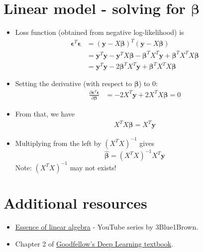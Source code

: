 \documentclass{article}
\theoremstyle{remark}
\theoremstyle{definition}
\begin{document}
\section*{Linear model - solving for $\bm{\beta}$}
\begin{itemize}
	\item Loss function (obtained from negative log-likelihood) is 
	\begin{align*}
		\bm{\epsilon}^T \bm{\epsilon}
		&= \left( \bm{y} - X\bm{\beta} \right)^T \left( \bm{y} - X\bm{\beta} \right) \\
		&= \bm{y}^T \bm{y} - \bm{y}^T X\bm{\beta} - \bm{\beta}^T X^T \bm{y} + \bm{\beta}^T X^T X \bm{\beta} \\
		&= \bm{y}^T \bm{y} - 2 \bm{\beta}^T X^T \bm{y} + \bm{\beta}^T X^T X \bm{\beta}
	\end{align*}
	
	\item Setting the derivative (with respect to $\bm{\beta}$) to 0:
	\begin{align*}
		\frac{\partial \bm{\epsilon}^T \bm{\epsilon}}{\partial \bm{\beta}}
		&= -2X^T \bm{y} + 2X^T X\bm{\beta} = 0
	\end{align*} 
	
	\item From that, we have 
	\begin{align*}
		X^T X\bm{\beta} = X^T \bm{y}
	\end{align*} 
	
	\item Multiplying from the left by $\left( X^T X \right)^{-1}$ gives
	$$
	\hat{\bm{\beta}} = \left( X^T X \right)^{-1} X^T \bm{y}
	$$
	Note: $\left( X^T X \right)^{-1}$ may not exists!
\end{itemize}
	
	\section*{Additional resources}
	\begin{itemize}
		\item \href{https://www.youtube.com/watch?v=fNk_zzaMoSs&list=PLZHQObOWTQDPD3MizzM2xVFitgF8hE_ab}{Essence of linear algebra} - YouTube series by 3Blue1Brown. 
		\item Chapter 2 of \href{https://www.deeplearningbook.org}{Goodfellow's Deep Learning textbook}.
	\end{itemize}
	
		
	
\end{document}
